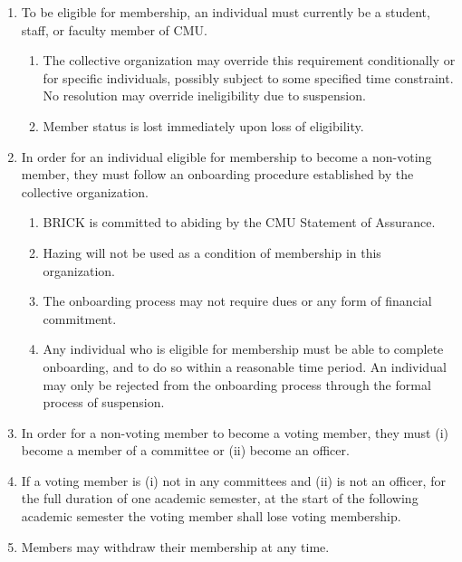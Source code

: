 \documentclass[11pt]{article}
\newcounter{h1}
\newcounter{h2}[h1]
\newcounter{h3}[h2]
\begin{document}
\begin{enumerate}
  \item To be eligible for membership, an individual must currently be a student, staff, or faculty member of CMU.  
  \begin{enumerate}
    \item The collective organization may override this requirement conditionally or for specific individuals, possibly subject to some specified time constraint. No resolution may override ineligibility due to suspension.  
    \item Member status is lost immediately upon loss of eligibility.  
  \end{enumerate}
  \item In order for an individual eligible for membership to become a non-voting member, they must follow an onboarding procedure established by the collective organization.  
  \begin{enumerate}
    \item BRICK is committed to abiding by the CMU Statement of Assurance.  
    \item Hazing will not be used as a condition of membership in this organization.  
    \item The onboarding process may not require dues or any form of financial commitment.  
    \item Any individual who is eligible for membership must be able to complete onboarding, and to do so within a reasonable time period. An individual may only be rejected from the onboarding process through the formal process of suspension.  
  \end{enumerate}
  \item In order for a non-voting member to become a voting member, they must (i) become a member of a committee or (ii) become an officer.  
  \item If a voting member is (i) not in any committees and (ii) is not an officer, for the full duration of one academic semester, at the start of the following academic semester the voting member shall lose voting membership.  
  \item Members may withdraw their membership at any time.
\end{enumerate}

\end{document}

